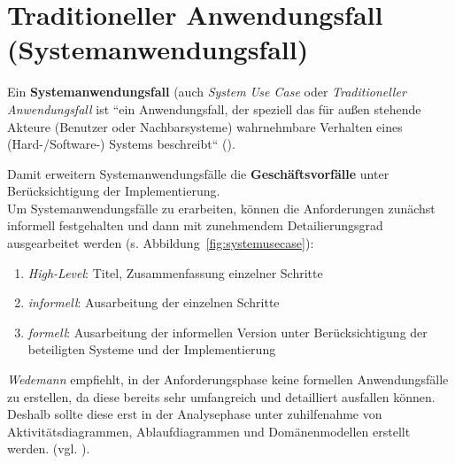
\section{Traditioneller Anwendungsfall (Systemanwendungsfall)}

\begin{tcolorbox}
    Ein \textbf{Systemanwendungsfall} (auch \textit{System Use Case} oder \textit{Traditioneller Anwendungsfall}
    ist ``ein Anwendungsfall, der speziell das für außen stehende Akteure (Benutzer oder Nachbarsysteme) wahrnehmbare Verhalten eines (Hard-/Software-) Systems beschreibt`` (\cite[361]{Oes05}).\\
\end{tcolorbox}

\noindent
Damit erweitern Systemanwendungsfälle die \textbf{Geschäftsvorfälle} unter Berücksichtigung der Implementierung.\\

\noindent
Um Systemanwendungsfälle zu erarbeiten, können die Anforderungen zunächst informell festgehalten und dann mit zunehmendem Detailierungsgrad ausgearbeitet werden (s. Abbildung~\ref{fig:systemusecase}):

\begin{enumerate}
    \item \textit{High-Level}: Titel, Zusammenfassung einzelner Schritte
    \item \textit{informell}: Ausarbeitung der einzelnen Schritte
    \item \textit{formell}: Ausarbeitung der informellen Version unter Berücksichtigung der beteiligten Systeme und der Implementierung
\end{enumerate}

\noindent
\textit{Wedemann} empfiehlt, in der Anforderungsphase keine formellen Anwendungsfälle zu erstellen, da diese bereits sehr umfangreich und detailliert ausfallen können.
Deshalb sollte diese erst in der Analysephase unter zuhilfenahme von Aktivitätsdiagrammen, Ablaufdiagrammen und Domänenmodellen erstellt werden. (vgl. \cite[71]{Wed09}).

